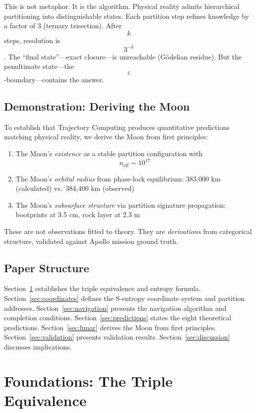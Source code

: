 \documentclass[11pt,twocolumn,a4paper]{article}
\theoremstyle{definition}
\theoremstyle{remark}
\begin{document}
This is not metaphor. It is the algorithm. Physical reality admits hierarchical partitioning into distinguishable states. Each partition step refines knowledge by a factor of 3 (ternary trisection). After $$k$$ steps, resolution is $$3^{-k}$$. The ``final state''---exact closure---is unreachable (G\"{o}delian residue). But the penultimate state---the $$\varepsilon$$-boundary---contains the answer.

\subsection{Demonstration: Deriving the Moon}

To establish that Trajectory Computing produces quantitative predictions matching physical reality, we derive the Moon from first principles:
\begin{enumerate}
    \item The Moon's \emph{existence} as a stable partition configuration with $$n_{\text{eff}} \sim 10^{17}$$
    \item The Moon's \emph{orbital radius} from phase-lock equilibrium: 383,000 km (calculated) vs.\ 384,400 km (observed)
    \item The Moon's \emph{subsurface structure} via partition signature propagation: bootprints at 3.5 cm, rock layer at 2.3 m
\end{enumerate}

These are not observations fitted to theory. They are \emph{derivations} from categorical structure, validated against Apollo mission ground truth.

\subsection{Paper Structure}

Section~\ref{sec:foundations} establishes the triple equivalence and entropy formula. Section~\ref{sec:coordinates} defines the S-entropy coordinate system and partition addresses. Section~\ref{sec:navigation} presents the navigation algorithm and completion conditions. Section~\ref{sec:predictions} states the eight theoretical predictions. Section~\ref{sec:lunar} derives the Moon from first principles. Section~\ref{sec:validation} presents validation results. Section~\ref{sec:discussion} discusses implications.

\section{Foundations: The Triple Equivalence}
\label{sec:foundations}
\end{document}
